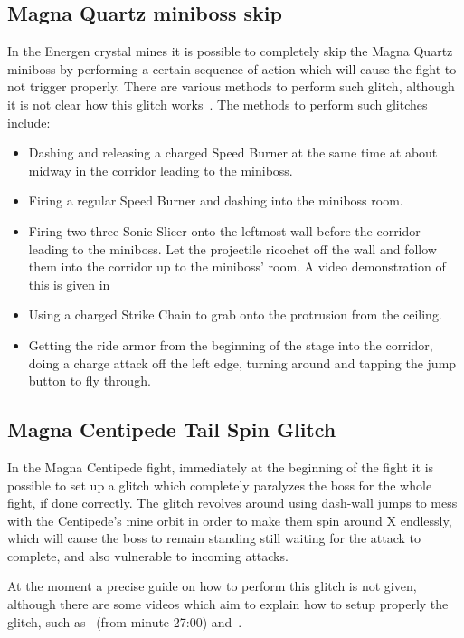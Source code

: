 \subsection{Magna Quartz miniboss skip}\label{ssect:Quartz_skip}
In the Energen crystal mines it is possible to completely skip the Magna Quartz miniboss by performing a certain sequence of action which will cause the fight to not trigger properly. There are various methods to perform such glitch, although it is not clear how this glitch works~\cite{rta:x2}.
The methods to perform such glitches include:
\begin{itemize}
	\item Dashing and releasing a charged Speed Burner at the same time at about midway in the corridor leading to the miniboss.
	\item Firing a regular Speed Burner and dashing into the miniboss room.
	\item Firing two-three Sonic Slicer onto the leftmost wall before the corridor leading to the miniboss. Let the projectile ricochet off the wall and follow them into the corridor up to the miniboss' room. A video demonstration of this is given in 
	\item Using a charged Strike Chain to grab onto the protrusion from the ceiling.
	\item Getting the ride armor from the beginning of the stage into the corridor, doing a charge attack off the left edge, turning around and tapping the jump button to fly through.
\end{itemize}


\subsection{Magna Centipede Tail Spin Glitch}
In the Magna Centipede fight, immediately at the beginning of the fight it is possible to set up a glitch which completely paralyzes the boss for the whole fight, if done correctly. The glitch revolves around using dash-wall jumps to mess with the Centipede's mine orbit in order to make them spin around X endlessly, which will cause the boss to remain standing still waiting for the attack to complete, and also vulnerable to incoming attacks. 

At the moment a precise guide on how to perform this glitch is not given, although there are some videos which aim to explain how to setup properly the glitch, such as~\cite{video:tail_spin_1} (from minute 27:00) and~\cite{video:tail_spin_2}.

